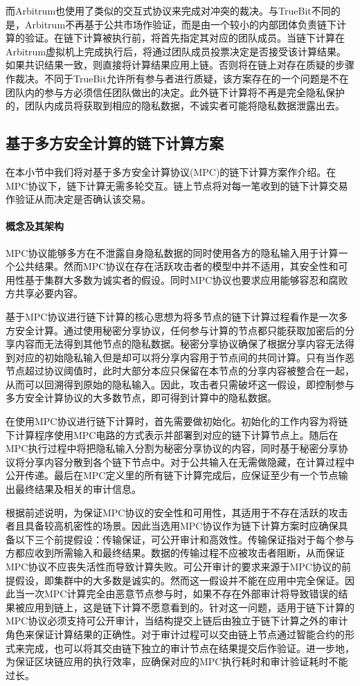 而Arbitrum\cite{217511}也使用了类似的交互式协议来完成对冲突的裁决。与TrueBit不同的是，Arbitrum不再基于公共市场作验证，而是由一个较小的内部团体负责链下计算的验证。在链下计算被执行前，将首先指定其对应的团队成员。当链下计算在Arbitrum虚拟机上完成执行后，将通过团队成员投票决定是否接受该计算结果。如果共识结果一致，则直接将计算结果应用上链。否则将在链上对存在质疑的步骤作裁决。不同于TrueBit允许所有参与者进行质疑，该方案存在的一个问题是不在团队内的参与方必须信任团队做出的决定。此外链下计算将不再是完全隐私保护的，团队内成员将获取到相应的隐私数据，不诚实者可能将隐私数据泄露出去。

\subsection{基于多方安全计算的链下计算方案}
在本小节中我们将对基于多方安全计算协议(MPC)的链下计算方案作介绍。在MPC协议下，链下计算无需多轮交互。链上节点将对每一笔收到的链下计算交易作验证从而决定是否确认该交易。

\paragraph{概念及其架构} 
MPC协议能够多方在不泄露自身隐私数据的同时使用各方的隐私输入用于计算一个公共结果。然而MPC协议在存在活跃攻击者的模型中并不适用，其安全性和可用性基于集群大多数为诚实者的假设\cite{cryptoeprint:2019/883}。同时MPC协议也要求应用能够容忍和腐败方共享必要内容。

基于MPC协议进行链下计算的核心思想为将多节点的链下计算过程看作是一次多方安全计算。通过使用秘密分享协议\cite{10.1145/359168.359176}，任何参与计算的节点都只能获取加密后的分享内容而无法得到其他节点的隐私数据。秘密分享协议确保了根据分享内容无法得到对应的初始隐私输入但是却可以将分享内容用于节点间的共同计算。只有当作恶节点超过协议阈值时，此时大部分本应只保留在本节点的分享内容被整合在一起，从而可以回溯得到原始的隐私输入。因此，攻击者只需破坏这一假设，即控制参与多方安全计算协议的大多数节点，即可得到计算中的隐私数据。

在使用MPC协议进行链下计算时，首先需要做初始化。初始化的工作内容为将链下计算程序使用MPC电路的方式表示并部署到对应的链下计算节点上。随后在MPC执行过程中将把隐私输入分割为秘密分享协议的内容，同时基于秘密分享协议将分享内容分散到各个链下节点中。对于公共输入在无需做隐藏，在计算过程中公开传递。最后在MPC定义里的所有链下计算完成后，应保证至少有一个节点输出最终结果及相关的审计信息。

根据前述说明，为保证MPC协议的安全性和可用性，其适用于不存在活跃的攻击者且具备较高机密性的场景。因此当选用MPC协议作为链下计算方案时应确保具备以下三个前提假设：传输保证，可公开审计和高效性\cite{8726497}。传输保证指对于每个参与方都应收到所需输入和最终结果。数据的传输过程不应被攻击者阻断，从而保证MPC协议不应丧失活性而导致计算失败\cite{Barak}。可公开审计的要求来源于MPC协议的前提假设，即集群中的大多数是诚实的。然而这一假设并不能在应用中完全保证。因此当一次MPC计算完全由恶意节点参与时，如果不存在外部审计将导致错误的结果被应用到链上，这是链下计算不愿意看到的。针对这一问题，适用于链下计算的MPC协议必须支持可公开审计，当结构提交上链后由独立于链下计算之外的审计角色来保证计算结果的正确性。对于审计过程可以交由链上节点通过智能合约的形式来完成，也可以将其交由链下独立的审计节点在结果提交后作验证。进一步地，为保证区块链应用的执行效率，应确保对应的MPC执行耗时和审计验证耗时不能过长。

